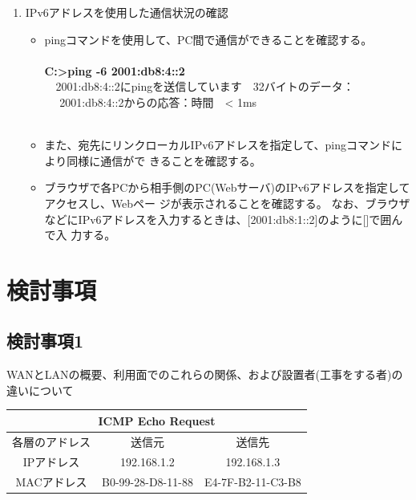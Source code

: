 \documentclass[10pt]{article}
\begin{document}
\begin{enumerate}
\begin{table}[H]
                    \end{table} 
                \endgroup
    \item IPv6アドレスを使用した通信状況の確認
        \begin{itemize}
            \item pingコマンドを使用して、PC間で通信ができることを確認する。\\\\
                  \textbf{C:>ping -6 2001:db8:4::2} \\
                　2001:db8:4::2にpingを送信しています　32バイトのデータ：\\
　                2001:db8:4::2からの応答：時間　< 1ms \\
　          \item また、宛先にリンクローカルIPv6アドレスを指定して、pingコマンドにより同様に通信がで
                    きることを確認する。 
            \item ブラウザで各PCから相手側のPC(Webサーバ)のIPv6アドレスを指定してアクセスし、Webペー
                    ジが表示されることを確認する。
                なお、ブラウザなどにIPv6アドレスを入力するときは、[2001:db8:1::2]のように[]で囲んで入
                力する。
            
        \end{itemize}
\end{enumerate}

\section{検討事項}

\subsection{検討事項1}
WANとLANの概要、利用面でのこれらの関係、および設置者(工事をする者)の違いについて


 \begingroup
            \setlength{\tabcolsep}{5pt} %
            \renewcommand{\arraystretch}{1.5} %
            \begin{table}[H]
            \centering
        	\begin{tabular}{|c|c|c|}
        	    \hline
        	   \multicolumn{3}{|c|}{ICMP Echo Request} \\ \hline
        		\hline\hline
            	   各層のアドレス & 送信元 & 送信先 \\ \hline
            	   IPアドレス & 192.168.1.2 & 192.168.1.3 \\ \hline
            	   MACアドレス & B0-99-28-D8-11-88 & E4-7F-B2-11-C3-B8 \\ \hline
            
        	\end{tabular}
        \end{table} 
        \endgroup
        
\end{document}
